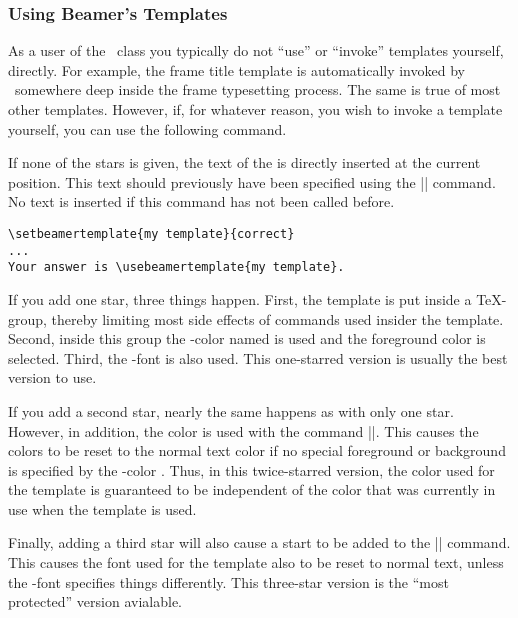 \subsubsection{Using Beamer's Templates}

As a user of the \beamer\ class you typically do not ``use'' or
``invoke'' templates yourself, directly. For example, the frame title
template is automatically invoked by \beamer\ somewhere deep inside
the frame typesetting process. The same is true of most other
templates. However, if, for whatever reason, you wish to invoke a
template yourself, you can use the following command.

\begin{command}{\usebeamertemplate\opt{|***|}}
  If none of the stars is given, the text of the 
  is directly inserted at the current position. This text should
  previously have been specified using the |\setbeamertemplate|
  command. No text is inserted if this command has not been called
  before.
  \example
\begin{verbatim}
\setbeamertemplate{my template}{correct}
...
Your answer is \usebeamertemplate{my template}.
\end{verbatim}

  If you add one star, three things happen. First, the template is put
  inside a \TeX-group, thereby limiting most side effects of commands
  used insider the template. Second, inside this group the
  \beamer-color named  is used and the foreground
  color is selected. Third, the \beamer-font  is
  also used. This one-starred version is usually the best version to
  use.

  If you add a second star, nearly the same happens as with only one
  star. However, in addition, the color is used with the command
  |\setbeamercolor*|. This causes the colors to be reset to the normal
  text color if no special foreground or background is specified by
  the \beamer-color . Thus, in this twice-starred
  version, the color used for the template is guaranteed to be
  independent of the color that was currently in use when the template
  is used.

  Finally, adding a third star will also cause a start to be added to
  the |\setbeamerfont*| command. This causes the font used for the
  template also to be reset to normal text, unless the \beamer-font
   specifies things differently. This three-star
  version is the ``most protected'' version avialable.
\end{command}



